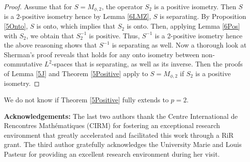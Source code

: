 \documentclass[12pt]{amsart}
\theoremstyle{remark}
\theoremstyle{definition}
\numberwithin{equation}{section}
\begin{document}
\begin{proof}
Assume that for $S=M_{\phi,2}$, the operator
$S_2$ is a  positive isometry. Then $S$ is a $2$-positive
isometry hence by Lemma \ref{6LMZ}, 
$S$ is separating. By Proposition \ref{5Onto}, $S$ is onto, which implies that $S_2$
is onto. Then, applying Lemma \ref{6Pos} with $S_2$, we obtain that
$S_2^{-1}$ is positive. Thus, $S^{-1}$ is  a 2-positive isometry
hence the above reasoning shows  that $S^{-1}$ is 
separating as well. Now a thorough look at  Sherman's proof 
reveals that \cite[Theorem 1.2]{Sh}
 holds for any onto isometry between non-commutative
$L^2$-spaces that is separating, as well as its inverse.
Then the proofs of Lemma \ref{5J} and Theorem \ref{5Positive} apply
to   $S=M_{\phi,2}$
if $S_2$ is a positive isometry.
\end{proof}

We do not know if Theorem \ref{5Positive} fully extends to $p=2$.


\bigskip\noindent
{\bf Acknowledgements:}
The last two authors thank the Centre International de Rencontres Mathématiques (CIRM) for fostering an exceptional research environment that greatly accelerated and facilitated this work through a RiR grant. The third author gratefully acknowledges the University  Marie and Louis Pasteur for providing an excellent research environment during her visit.
\vskip 1cm
\end{document}
